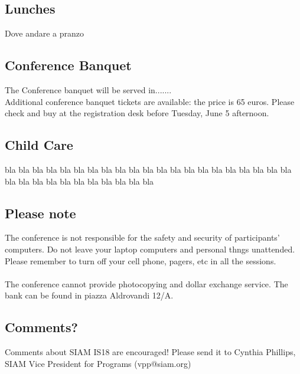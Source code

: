 \begin{multicols}{2}
\subsection*{Lunches}
Dove andare a pranzo
\subsection*{Conference Banquet}
The Conference banquet will be served in.......\\ Additional conference banquet tickets are available: the price is 65 euros. Please check and buy at the registration desk before Tuesday, June 5 afternoon.
\subsection*{Child Care}
bla bla bla bla bla bla bla bla bla bla bla bla bla bla bla bla bla bla bla bla bla bla bla bla bla bla bla bla bla bla bla bla
\subsection*{Please note}
The conference is not responsible for the safety and security of participants' computers. Do not leave your laptop computers and personal thngs unattended. Please remember to turn off your cell phone, pagers, etc in all the sessions.\\\\ The conference cannot provide photocopying and dollar exchange service. The bank can be found in piazza Aldrovandi 12/A.
\subsection*{Comments?}
Comments about SIAM IS18 are encouraged! Please send it to Cynthia Phillips, SIAM Vice President for Programs (vpp@siam.org)
\end{multicols}
